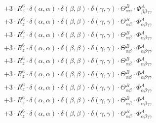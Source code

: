 \documentclass{article}
\begin{document}
\begin{subequations}
\begin{gather}
\begin{array}{c}
 \\[0.2em] 		 + 3 \cdot R_{z}^{6} \cdot \delta{}\left(\alpha{}, \alpha{}\right) \cdot \delta{}\left(\beta{}, \beta{}\right) \cdot \delta{}\left(\gamma{}, \gamma{}\right) \cdot \Theta{}^{B}_{\alpha{}\alpha{}} \cdot \Phi{}^{A}_{\beta{}\beta{}\gamma{}\gamma{}} 
 \\[0.2em] 		 + 3 \cdot R_{z}^{6} \cdot \delta{}\left(\alpha{}, \alpha{}\right) \cdot \delta{}\left(\beta{}, \beta{}\right) \cdot \delta{}\left(\gamma{}, \gamma{}\right) \cdot \Theta{}^{B}_{\alpha{}\beta{}} \cdot \Phi{}^{A}_{\alpha{}\beta{}\gamma{}\gamma{}} 
 \\[0.2em] 		 + 3 \cdot R_{z}^{6} \cdot \delta{}\left(\alpha{}, \alpha{}\right) \cdot \delta{}\left(\beta{}, \beta{}\right) \cdot \delta{}\left(\gamma{}, \gamma{}\right) \cdot \Theta{}^{B}_{\alpha{}\beta{}} \cdot \Phi{}^{A}_{\alpha{}\beta{}\gamma{}\gamma{}} 
 \\[0.2em] 		 + 3 \cdot R_{z}^{6} \cdot \delta{}\left(\alpha{}, \alpha{}\right) \cdot \delta{}\left(\beta{}, \beta{}\right) \cdot \delta{}\left(\gamma{}, \gamma{}\right) \cdot \Theta{}^{B}_{\alpha{}\beta{}} \cdot \Phi{}^{A}_{\alpha{}\beta{}\gamma{}\gamma{}} 
 \\[0.2em] 		 + 3 \cdot R_{z}^{6} \cdot \delta{}\left(\alpha{}, \alpha{}\right) \cdot \delta{}\left(\beta{}, \beta{}\right) \cdot \delta{}\left(\gamma{}, \gamma{}\right) \cdot \Theta{}^{B}_{\alpha{}\beta{}} \cdot \Phi{}^{A}_{\alpha{}\beta{}\gamma{}\gamma{}} 
 \\[0.2em] 		 + 3 \cdot R_{z}^{6} \cdot \delta{}\left(\alpha{}, \alpha{}\right) \cdot \delta{}\left(\beta{}, \beta{}\right) \cdot \delta{}\left(\gamma{}, \gamma{}\right) \cdot \Theta{}^{B}_{\alpha{}\beta{}} \cdot \Phi{}^{A}_{\alpha{}\beta{}\gamma{}\gamma{}} 
 \\[0.2em] 		 + 3 \cdot R_{z}^{6} \cdot \delta{}\left(\alpha{}, \alpha{}\right) \cdot \delta{}\left(\beta{}, \beta{}\right) \cdot \delta{}\left(\gamma{}, \gamma{}\right) \cdot \Theta{}^{B}_{\alpha{}\beta{}} \cdot \Phi{}^{A}_{\alpha{}\beta{}\gamma{}\gamma{}} 
 \\[0.2em] 		 + 3 \cdot R_{z}^{6} \cdot \delta{}\left(\alpha{}, \alpha{}\right) \cdot \delta{}\left(\beta{}, \beta{}\right) \cdot \delta{}\left(\gamma{}, \gamma{}\right) \cdot \Theta{}^{B}_{\alpha{}\beta{}} \cdot \Phi{}^{A}_{\alpha{}\beta{}\gamma{}\gamma{}} 
 \\[0.2em] 		 + 3 \cdot R_{z}^{6} \cdot \delta{}\left(\alpha{}, \alpha{}\right) \cdot \delta{}\left(\beta{}, \beta{}\right) \cdot \delta{}\left(\gamma{}, \gamma{}\right) \cdot \Theta{}^{B}_{\alpha{}\beta{}} \cdot \Phi{}^{A}_{\alpha{}\beta{}\gamma{}\gamma{}} 

\end{array}
\end{gather}
\end{subequations}
\end{document}
